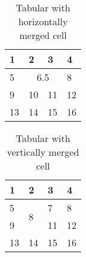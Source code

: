 \begin{table}
\begin{tabularx}{\textwidth}{|X|X|X|X|}
\hline
 1&2&3&4\\
\hline
 5&\multicolumn{2}{c|}{6.5}&8\\
\hline
 9&10&11&12\\
\hline
 13&14&15&16\\
 \hline
\end{tabularx}
\caption{Tabular with horizontally merged cell}
\label{tab:tabularxmulticolumns}
\end{table}


\begin{table}
\begin{tabularx}{\textwidth}{|X|X|X|X|}
\hline
 1&2&3&4\\
\hline
 5&\multirow{2}{*}{8}& 7 &8\\
\cline{1-1}\cline{3-4}
 9& &11&12\\
\hline
 13&14&15&16\\
 \hline
\end{tabularx}
\caption{Tabular with vertically merged cell}
\label{tab:tabularxmultirow}
\end{table}
 
